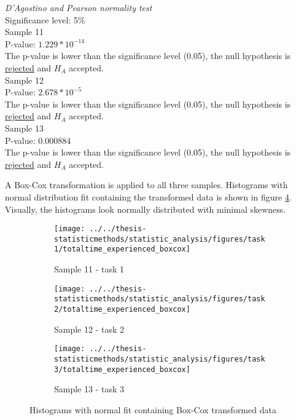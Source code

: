   \begin{center}
 	\begin{tcolorbox}[width=0.80\textwidth]
 		\centering
 		\textit{D'Agostino and Pearson normality test}\\
 		Significance level: 5\%  \\[0.5cm]
 		
 		Sample 11 \\
 		P-value: $1.229 * 10^{-14}$\\
 		The p-value is lower than the significance level (0.05), the null hypothesis is \underline{rejected} and $H_A$ accepted.\\[0.5cm]
 		
 		Sample 12 \\
 		P-value: $2.678 * 10^{-5}$ \\
		The p-value is lower than the significance level (0.05), the null hypothesis is \underline{rejected} and $H_A$ accepted.\\[0.5cm]
 		
 		Sample 13 \\
 		P-value: $0.000884$ \\
 		The p-value is lower than the significance level (0.05), the null hypothesis is \underline{rejected} and $H_A$ accepted.\\[0.5cm]
 	\end{tcolorbox} 
 \end{center}

\vspace{0.3cm}

A Box-Cox transformation is applied to all three samples. Histograms with normal distribution fit containing the transformed data is shown in figure \ref{fig:sample11_12_13_boxcox_histogram}. Visually, the histograms look normally distributed with minimal skewness. \\

\begin{figure}[H]
	\centering
	\begin{subfigure}[b]{0.32\textwidth}
		\centering
		\texttt{[image: ../../thesis-statisticmethods/statistic\_analysis/figures/task1/totaltime\_experienced\_boxcox]}
		\caption{Sample 11 - task 1}
		\label{fig:totaltimeexperiencedboxcox_task1}
	\end{subfigure}
	\begin{subfigure}[b]{0.32\textwidth}
		\centering
		\texttt{[image: ../../thesis-statisticmethods/statistic\_analysis/figures/task2/totaltime\_experienced\_boxcox]}
		\caption{Sample 12 - task 2}
		\label{fig:totaltimeexperiencedboxcox_task2}
	\end{subfigure}
	\begin{subfigure}[b]{0.32\textwidth}
		\centering
		\texttt{[image: ../../thesis-statisticmethods/statistic\_analysis/figures/task3/totaltime\_experienced\_boxcox]}
		\caption{Sample 13 - task 3}
		\label{fig:totaltimeexperiencedboxcox_task3}
	\end{subfigure}
	\caption{Histograms with normal fit containing Box-Cox transformed data}
	\label{fig:sample11_12_13_boxcox_histogram}
\end{figure}

